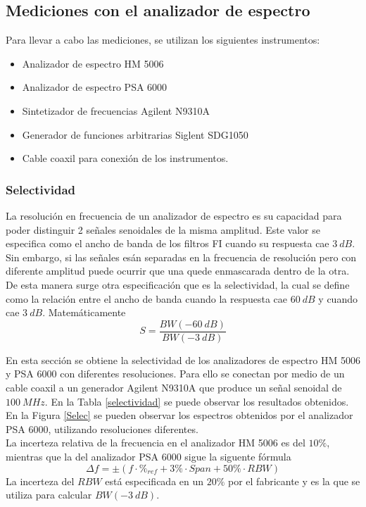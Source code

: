 \documentclass[a4paper,10pt]{article}
\begin{document}
	\subsection{Mediciones con el analizador de espectro}
\indent Para llevar a cabo las mediciones, se utilizan los siguientes
		instrumentos:
		\begin{itemize}
			\item Analizador de espectro HM 5006
			\item Analizador de espectro PSA 6000
			\item Sintetizador de frecuencias Agilent N9310A
			\item Generador de funciones arbitrarias Siglent SDG1050
			\item Cable coaxil para conexi\'on de los instrumentos.
		\end{itemize}	

		\subsubsection{Selectividad}
		\indent La resoluci\'on en frecuencia de un analizador de espectro es su
		capacidad para poder distinguir 2 se\~nales senoidales de la misma 
		amplitud. Este valor se especifica como el ancho de banda de los filtros
		FI cuando su respuesta cae $3~dB$. \\ 
		\indent Sin embargo, si las se\~nales es\'an separadas en la frecuencia 
		de resoluci\'on pero con diferente amplitud puede ocurrir que una quede 
		enmascarada dentro de la otra. De esta manera surge otra 
		especificaci\'on que es la selectividad, la cual se define como la 
		relaci\'on entre el ancho de banda cuando la respuesta cae $60~dB$ y 
		cuando cae $3~dB$. Matem\'aticamente 
		$$S=\frac{BW(-60~dB)}{BW(-3~dB)}$$
	
		\indent En esta secci\'on se obtiene la selectividad de los analizadores
		de espectro HM 5006 y PSA 6000 con diferentes resoluciones. Para ello se
		conectan por medio de un cable coaxil a un generador Agilent N9310A que 
		produce un se\~nal senoidal de $100~MHz$. En la Tabla \ref{selectividad}
		se puede observar los resultados obtenidos. En la Figura \ref{Selec} se 
		pueden observar los espectros obtenidos por el analizador PSA 6000, 
		utilizando resoluciones diferentes. \\
		\indent La incerteza relativa de la frecuencia en el analizador HM 5006 
		es del $10\%$, mientras que la  del analizador PSA 6000 sigue la 
		siguente f\'ormula
		$$\Delta f=\pm\left(f\cdot \%_{ref} +3\%\cdot Span+50\%\cdot RBW \right)$$
		La incerteza del $RBW$ est\'a especificada en un $20\%$ por el fabricante y es la que se utiliza para calcular $BW(-3~dB)$.
		
\end{document}
